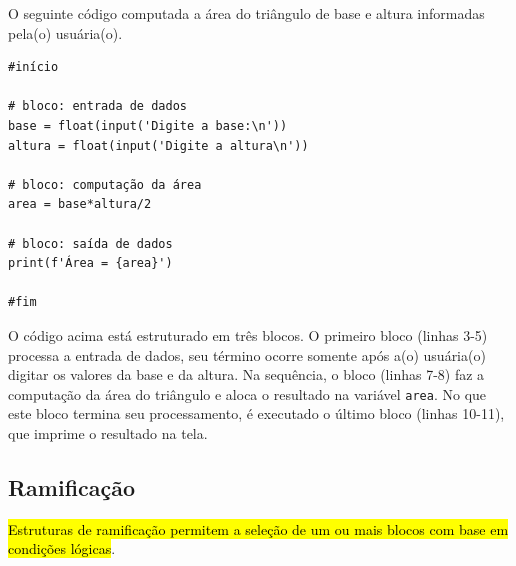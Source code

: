 \begin{ex}
  O seguinte código computada a área do triângulo de base e altura informadas pela(o) usuária(o).

\begin{lstlisting}
#início

# bloco: entrada de dados
base = float(input('Digite a base:\n'))
altura = float(input('Digite a altura\n'))

# bloco: computação da área
area = base*altura/2

# bloco: saída de dados
print(f'Área = {area}')

#fim
\end{lstlisting}

O código acima está estruturado em três blocos. O primeiro bloco (linhas 3-5) processa a entrada de dados, seu término ocorre somente após a(o) usuária(o) digitar os valores da base e da altura. Na sequência, o bloco (linhas 7-8) faz a computação da área do triângulo e aloca o resultado na variável \lstinline+area+. No que este bloco termina seu processamento, é executado o último bloco (linhas 10-11), que imprime o resultado na tela.
\end{ex}

\subsection{Ramificação}

\hl{Estruturas de ramificação permitem a seleção de um ou mais blocos com base em condições lógicas}.

